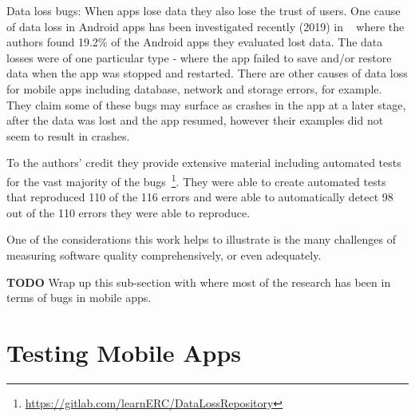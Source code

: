 
Data loss bugs: When apps lose data they also lose the trust of users. One cause of data loss in Android apps has been investigated recently (2019) in ~\cite{riganelli2019benchmark_android_data_loss_bugs} where the authors found 19.2\% of the Android apps they evaluated lost data. The data losses were of one particular type - where the app failed to save and/or restore data when the app was stopped and restarted. There are other causes of data loss for mobile apps including database, network and storage errors, for example. They claim some of these bugs may surface as crashes in the app at a later stage, after the data was lost and the app resumed, however their examples did not seem to result in crashes.  

To the authors' credit they provide extensive material including automated tests for the vast majority of the bugs~\footnote{\url{https://gitlab.com/learnERC/DataLossRepository}}. They were able to create automated tests that reproduced 110 of the 116 errors and were able to automatically detect 98 out of the 110 errors they were able to reproduce.

One of the considerations this work helps to illustrate is the many challenges of measuring software quality comprehensively, or even adequately.

\textbf{TODO} Wrap up this sub-section with where most of the research has been in terms of bugs in mobile apps.

\hypertarget{mobile.testing}{}
\section{Testing Mobile Apps}

